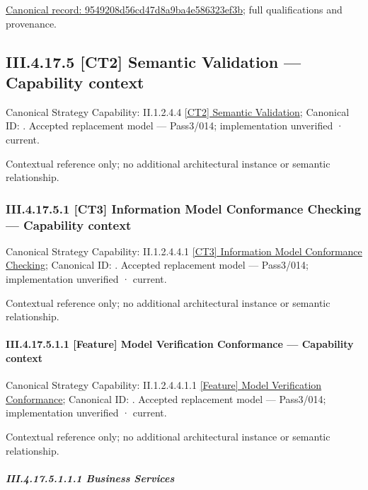 {\footnotesize \href{../../../../../../../continuum/business/business-function/9549208d56cd47d8a9ba4e586323ef3b.md}{Canonical record: 9549208d56cd47d8a9ba4e586323ef3b}; full qualifications and provenance.}\par
\subsection*{III.4.17.5 [CT2] Semantic Validation — Capability context}
\label{navigation:III.4.17.5}

{\small Canonical Strategy Capability: II.1.2.4.4 \hyperref[element:5dfb80f15eff4ec8bbb60016d36a5cd1]{[CT2] Semantic Validation}; Canonical ID: \texttt{}. Accepted replacement model — Pass3/014; implementation unverified · current.}\par
Contextual reference only; no additional architectural instance or semantic relationship.\par
\subsubsection*{III.4.17.5.1 [CT3] Information Model Conformance Checking — Capability context}
\label{navigation:III.4.17.5.1}

{\small Canonical Strategy Capability: II.1.2.4.4.1 \hyperref[element:a3a6683b5a48418ca51c94784fc24bee]{[CT3] Information Model Conformance Checking}; Canonical ID: \texttt{}. Accepted replacement model — Pass3/014; implementation unverified · current.}\par
Contextual reference only; no additional architectural instance or semantic relationship.\par
\paragraph*{III.4.17.5.1.1 [Feature] Model Verification Conformance — Capability context}
\label{navigation:III.4.17.5.1.1}

{\small Canonical Strategy Capability: II.1.2.4.4.1.1 \hyperref[element:89e8a277738845cbb768e8685e8e2d56]{[Feature] Model Verification Conformance}; Canonical ID: \texttt{}. Accepted replacement model — Pass3/014; implementation unverified · current.}\par
Contextual reference only; no additional architectural instance or semantic relationship.\par
\subparagraph*{III.4.17.5.1.1.1 Business Services}
\label{navigation:III.4.17.5.1.1.1}

